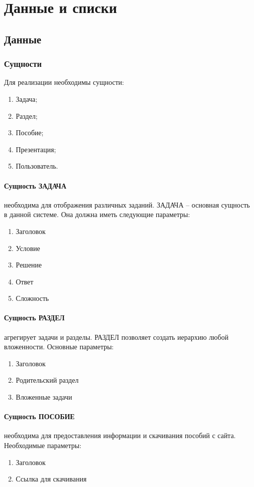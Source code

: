 \section{Данные и списки}
\subsection{Данные}
\subsubsection{Сущности}

Для реализации необходимы сущности:
\begin{enumerate}
  \item Задача;
  \item Раздел;
  \item Пособие;
  \item Презентация;
  \item Пользователь.
\end{enumerate}

\paragraph{Сущность ЗАДАЧА} необходима для отображения различных заданий. ЗАДАЧА -- основная сущность в данной системе. Она должна иметь следующие параметры:
\begin{enumerate}
  \item Заголовок
  \item Условие
  \item Решение
  \item Ответ
  \item Сложность
\end{enumerate}

\paragraph{Сущность РАЗДЕЛ} агрегирует задачи и разделы. РАЗДЕЛ позволяет создать иерархию любой вложенности. Основные параметры:
\begin{enumerate}
  \item Заголовок
  \item Родительский раздел
  \item Вложенные задачи
\end{enumerate}

\paragraph{Сущность ПОСОБИЕ} необходима для предоставления информации и скачивания пособий с сайта. Необходимые параметры:
\begin{enumerate}
  \item Заголовок
  \item Ссылка для скачивания
\end{enumerate}

